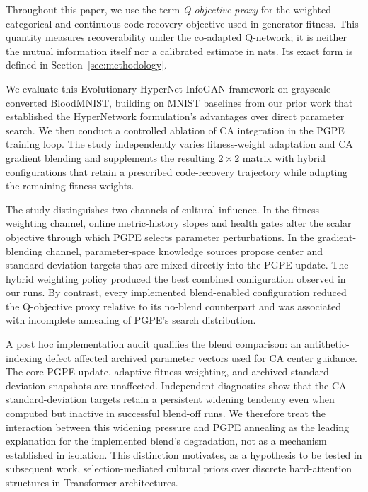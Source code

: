 
Throughout this paper, we use the term \textit{Q-objective proxy} for the weighted categorical and continuous code-recovery objective used in generator fitness. This quantity measures recoverability under the co-adapted Q-network; it is neither the mutual information itself nor a calibrated estimate in nats. Its exact form is defined in Section~\ref{sec:methodology}.

We evaluate this Evolutionary HyperNet-InfoGAN framework on grayscale-converted BloodMNIST, building on MNIST baselines from our prior work that established the HyperNetwork formulation's advantages over direct parameter search. We then conduct a controlled ablation of CA integration in the PGPE training loop. The study independently varies fitness-weight adaptation and CA gradient blending and supplements the resulting $2\times2$ matrix with hybrid configurations that retain a prescribed code-recovery trajectory while adapting the remaining fitness weights.

The study distinguishes two channels of cultural influence. In the fitness-weighting channel, online metric-history slopes and health gates alter the scalar objective through which PGPE selects parameter perturbations. In the gradient-blending channel, parameter-space knowledge sources propose center and standard-deviation targets that are mixed directly into the PGPE update. The hybrid weighting policy produced the best combined configuration observed in our runs. By contrast, every implemented blend-enabled configuration reduced the Q-objective proxy relative to its no-blend counterpart and was associated with incomplete annealing of PGPE's search distribution.

A post hoc implementation audit qualifies the blend comparison: an antithetic-indexing defect affected archived parameter vectors used for CA center guidance. The core PGPE update, adaptive fitness weighting, and archived standard-deviation snapshots are unaffected. Independent diagnostics show that the CA standard-deviation targets retain a persistent widening tendency even when computed but inactive in successful blend-off runs. We therefore treat the interaction between this widening pressure and PGPE annealing as the leading explanation for the implemented blend's degradation, not as a mechanism established in isolation. This distinction motivates, as a hypothesis to be tested in subsequent work, selection-mediated cultural priors over discrete hard-attention structures in Transformer architectures.

